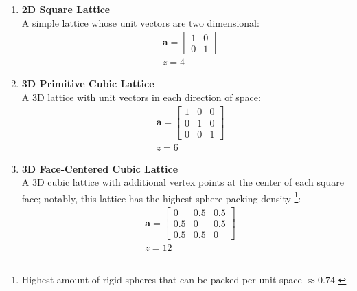 \begin{enumerate} 
    \item \textbf{2D Square Lattice} \\ 
        A simple lattice whose unit vectors are two dimensional: 
        \begin{equation}
            \begin{split}
                & \mathbf{a} = \begin{bmatrix}
                    1 & 0 \\
                    0 & 1
                    \end{bmatrix} \\
                & z = 4
            \end{split}
        \end{equation}
    \item \textbf{3D Primitive Cubic Lattice} \\
        A 3D lattice with unit vectors in each direction of space:
        \begin{equation}
            \begin{split}
               & \mathbf{a} = \begin{bmatrix}
                1 & 0 & 0 \\
                0 & 1 & 0 \\
                0 & 0 & 1
            \end{bmatrix} \\
            & z = 6 
            \end{split}
        \end{equation}
    \item \textbf{3D Face-Centered Cubic Lattice} \\
        A 3D cubic lattice with additional vertex points
        at the center of each square face; notably,
        this lattice has the highest sphere packing density \footnote{Highest amount
        of rigid spheres that can be packed per unit space $\approx 0.74$ \cite{Hoque}}:
        \begin{equation}
            \begin{split}
                & \mathbf{a} = \begin{bmatrix}
                    0 & 0.5 & 0.5 \\
                    0.5 & 0 & 0.5 \\
                    0.5 & 0.5 & 0
                \end{bmatrix} \\
                & z = 12
            \end{split}
        \end{equation}
\end{enumerate}


